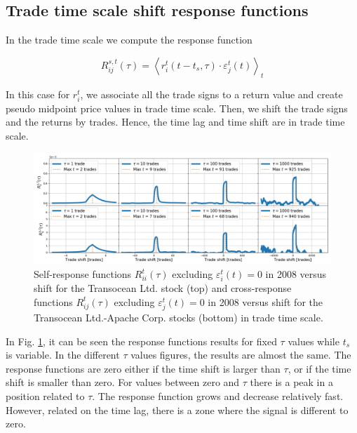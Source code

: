 \subsection{Trade time scale shift response functions}
\label{subsec:time_shift_trade}

In the trade time scale we compute the response function

\begin{equation}\label{eq:time_shift_trade}
    R_{ij}^{s, t}\left(\tau\right)=\left\langle r^{t}_{i}
    \left(t-t_{s},\tau\right) \cdot\varepsilon^{t}_{j}
    \left(t\right)\right\rangle _{t}
\end{equation}

In this case for $r^{t}_{i}$, we associate all the trade signs to a return
value and create pseudo midpoint price values in trade time scale. Then, we
shift the trade signs and the returns by trades. Hence, the time lag and time
shift are in trade time scale.

\begin{figure}[htbp]
    \centering
    \includegraphics[width=\textwidth]{figures/04_shift_trade_RIG_APA.png}
    \caption{Self-response functions $R_{ii}^{t}\left(\tau\right)$ excluding
             $\varepsilon^{t}_{i}\left(t\right) = 0$ in 2008 versus shift for
             the Transocean Ltd. stock (top) and cross-response functions
             $R_{ij}^{t}\left(\tau\right)$ excluding
             $\varepsilon^{t}_{j}\left(t\right) = 0$ in 2008 versus shift for
             the Transocean Ltd.-Apache Corp. stocks (bottom) in trade time
             scale.}
    \label{fig:shift_trade_scale}
\end{figure}

In Fig. \ref{fig:shift_trade_scale}, it can be seen the response functions
results for fixed $\tau$ values while $t_{s}$ is variable. In the different
$\tau$ values figures, the results are almost the same. The response functions
are zero either if the time shift is larger than $\tau$, or if the time shift
is smaller than zero. For values between zero and $\tau$ there is a peak in a
position related to $\tau$. The response function grows and decrease relatively
fast. However, related on the time lag, there is a zone where the signal is
different to zero.

